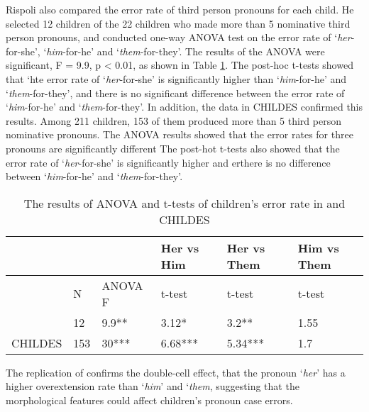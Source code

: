 Rispoli also compared the error rate of third person pronouns for each child. He selected 12 children of the 22 children who made more than 5 nominative third person pronouns, and conducted one-way ANOVA test on the error rate of `\textit{her}-for-she', `\textit{him}-for-he' and `\textit{them}-for-they'. The results of the ANOVA were significant, F = 9.9, p < 0.01, as shown in Table \ref{tab:mario}. The post-hoc t-tests showed that `hte error rate of `\textit{her}-for-she' is significantly higher than `\textit{him}-for-he' and `\textit{them}-for-they', and there is no significant difference between the error rate of `\textit{him}-for-he' and `\textit{them}-for-they'. In addition, the data in CHILDES confirmed this results. Among 211 children, 153 of them produced more than 5 third person nominative pronouns. The ANOVA results showed that the error rates for three pronouns are significantly different The post-hot t-tests also showed that the error rate of `\textit{her}-for-she' is significantly higher and erthere is no difference between `\textit{him}-for-he' and `\textit{them}-for-they'. 
\FloatBarrier
\begin{table}[!h]
\centering
\caption{The results of ANOVA and t-tests of children's error rate in \cite{rispoli1998patterns} and CHILDES}
\label{tab:mario}
\begin{tabular}{l|l|l|lll}
\toprule
 & &  & Her vs Him & Her vs Them & Him vs Them \\ \hline
 & N & ANOVA F & t-test & t-test & t-test \\ \hline
\cite{rispoli1998patterns} & 12 &  9.9** & 3.12* & 3.2** & 1.55 \\ \hline
CHILDES & 153 & 30*** & 6.68*** & 5.34*** & 1.7\\
\bottomrule
\end{tabular}
\end{table}
\FloatBarrier

The replication of \cite{rispoli1998patterns} confirms the double-cell effect, that the pronoun `\textit{her}' has a higher overextension rate than `\textit{him}' and `\textit{them}, suggesting that the morphological features could affect children's pronoun case errors. 

